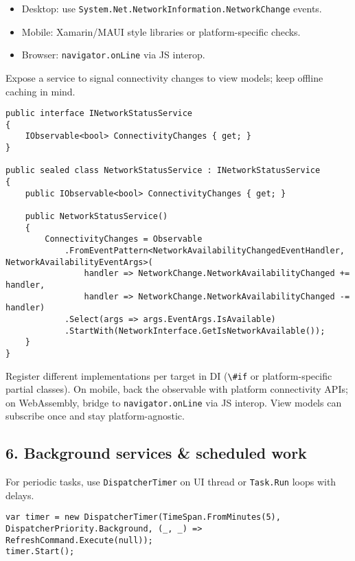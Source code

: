 \begin{itemize}
\tightlist
\item
  Desktop: use
  \passthrough{\lstinline!System.Net.NetworkInformation.NetworkChange!}
  events.
\item
  Mobile: Xamarin/MAUI style libraries or platform-specific checks.
\item
  Browser: \passthrough{\lstinline!navigator.onLine!} via JS interop.
\end{itemize}

Expose a service to signal connectivity changes to view models; keep
offline caching in mind.

\begin{lstlisting}
public interface INetworkStatusService
{
    IObservable<bool> ConnectivityChanges { get; }
}

public sealed class NetworkStatusService : INetworkStatusService
{
    public IObservable<bool> ConnectivityChanges { get; }

    public NetworkStatusService()
    {
        ConnectivityChanges = Observable
            .FromEventPattern<NetworkAvailabilityChangedEventHandler, NetworkAvailabilityEventArgs>(
                handler => NetworkChange.NetworkAvailabilityChanged += handler,
                handler => NetworkChange.NetworkAvailabilityChanged -= handler)
            .Select(args => args.EventArgs.IsAvailable)
            .StartWith(NetworkInterface.GetIsNetworkAvailable());
    }
}
\end{lstlisting}

Register different implementations per target in DI
(\passthrough{\lstinline!\#if!} or platform-specific partial classes).
On mobile, back the observable with platform connectivity APIs; on
WebAssembly, bridge to \passthrough{\lstinline!navigator.onLine!} via JS
interop. View models can subscribe once and stay platform-agnostic.

\subsection{6. Background services \& scheduled
work}\label{background-services-scheduled-work}

For periodic tasks, use \passthrough{\lstinline!DispatcherTimer!} on UI
thread or \passthrough{\lstinline!Task.Run!} loops with delays.

\begin{lstlisting}
var timer = new DispatcherTimer(TimeSpan.FromMinutes(5), DispatcherPriority.Background, (_, _) => RefreshCommand.Execute(null));
timer.Start();
\end{lstlisting}

